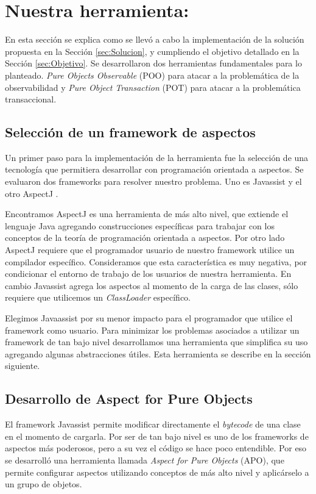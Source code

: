 \section{Nuestra herramienta: }

En esta sección se explica como se llevó a cabo la implementación de la solución
propuesta en la Sección \ref{sec:Solucion}, y cumpliendo el objetivo detallado
en la Sección \ref{sec:Objetivo}. Se desarrollaron dos herramientas
fundamentales para lo planteado. \emph{Pure Objects Observable} (POO) para atacar a la
problemática de la observabilidad y \emph{Pure Object Transaction} (POT) para
atacar a la problemática transaccional.
	
	\subsection{Selección de un framework de aspectos}  
	Un primer paso para la implementación de la herramienta fue la selección de una
	tecnología que permitiera desarrollar con programación orientada a aspectos.
	Se evaluaron dos frameworks para resolver nuestro problema.
	Uno es Javassist \cite{??} y el otro AspectJ \cite{KiczalesHHKPG01}.

	\medskip 
	Encontramos AspectJ es una herramienta de más alto nivel, que extiende
	el lenguaje Java agregando construcciones específicas para trabajar con
	los conceptos de la teoría de programación orientada a aspectos.
	Por otro lado AspectJ requiere que el programador usuario de nuestro framework
	utilice un compilador específico. Consideramos que esta característica es muy
	negativa, por condicionar el entorno de trabajo de los usuarios de nuestra
	herramienta.
	En cambio Javassist agrega los aspectos al momento de la carga de las clases,
	sólo requiere que utilicemos un \emph{ClassLoader} específico.

	Elegimos Javaassist por su menor impacto para el programador que utilice el
	framework como usuario.
	Para minimizar los problemas asociados a utilizar un framework de tan bajo
	nivel desarrollamos una herramienta que simplifica su uso agregando algunas
	abstracciones útiles. Esta herramienta se describe en la sección siguiente.

	\subsection{Desarrollo de Aspect for Pure Objects}

	El framework Javassist permite modificar directamente el \emph{bytecode} de
	una clase en el momento de cargarla.
	Por ser de tan bajo nivel es uno de los frameworks de aspectos más poderosos,
	pero a su vez el código se hace poco entendible.
	Por eso se desarrolló una herramienta llamada \emph{Aspect for Pure Objects} (APO), 
	que permite configurar aspectos utilizando conceptos de más alto nivel y
	aplicárselo a un grupo de objetos.
	
